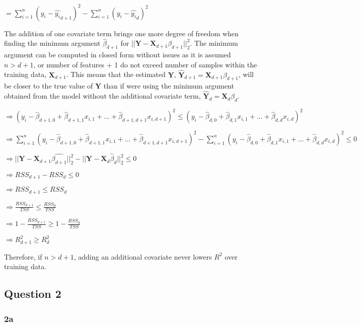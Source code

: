 \documentclass[
]{article}
\begin{document}
\(= \sum^n_{i=1}(y_i-\hat{y_i}_{d+1})^2 - \sum^n_{i=1}(y_i-\hat{y_i}_d)^2\)

The addition of one covariate term brings one more degree of freedom
when finding the minimum argument \(\hat{\beta}_{d+1}\) for
\(||\textbf{Y} - \textbf{X}_{d+1}\beta_{d+1}||^2_2\). The minimum
argument can be computed in closed form without issues as it is assumed
\(n > d+1\), or number of features + 1 do not exceed number of samples
within the training data, \(\textbf{X}_{d+1}\). This means that the
estimated \(\textbf{Y}\),
\(\hat{\textbf{Y}}_{d+1} = \textbf{X}_{d+1}\beta_{d+1}\), will be closer
to the true value of \(\textbf{Y}\) than if were using the minimum
argument obtained from the model without the additional covariate term,
\(\hat{\textbf{Y}}_{d} = \textbf{X}_{d}\beta_{d}\).

\(\Rightarrow (y_i-\hat{\beta}_{d+1,0}+\hat{\beta}_{d+1, 1}x_{i,1}+...+\hat{\beta}_{d+1, d+1}x_{i,d+1})^2 \leq (y_i-\hat{\beta}_{d,0}+\hat{\beta}_{d, 1}x_{i,1}+...+\hat{\beta}_{d, d}x_{i,d})^2\)

\(\Rightarrow \sum^n_{i=1}(y_i-\hat{\beta}_{d+1,0}+\hat{\beta}_{d+1, 1}x_{i,1}+...+\hat{\beta}_{d+1, d+1}x_{i,d+1})^2 - \sum^n_{i=1}(y_i-\hat{\beta}_{d,0}+\hat{\beta}_{d, 1}x_{i,1}+...+\hat{\beta}_{d, d}x_{i,d})^2 \leq 0\)

\(\Rightarrow ||\textbf{Y} - \textbf{X}_{d+1}\hat{\beta_{d+1}}||^2_2 - ||\textbf{Y} - \textbf{X}_d\hat{\beta}_d||^2_2 \leq 0\)

\(\Rightarrow RSS_{d+1} - RSS_d \leq 0\)

\(\Rightarrow RSS_{d+1} \leq RSS_d\)

\(\Rightarrow \frac{RSS_{d+1}}{TSS} \leq \frac{RSS_d}{TSS}\)

\(\Rightarrow 1-\frac{RSS_{d+1}}{TSS} \geq 1-\frac{RSS_d}{TSS}\)

\(\Rightarrow R^2_{d+1} \geq R^2_d\)

Therefore, if \(n > d+1\), adding an additional covariate never lowers
\(R^2\) over training data.

\hypertarget{question-2}{%
\subsection{Question 2}\label{question-2}}

\hypertarget{a-1}{%
\subsubsection{2a}\label{a-1}}
\end{document}
